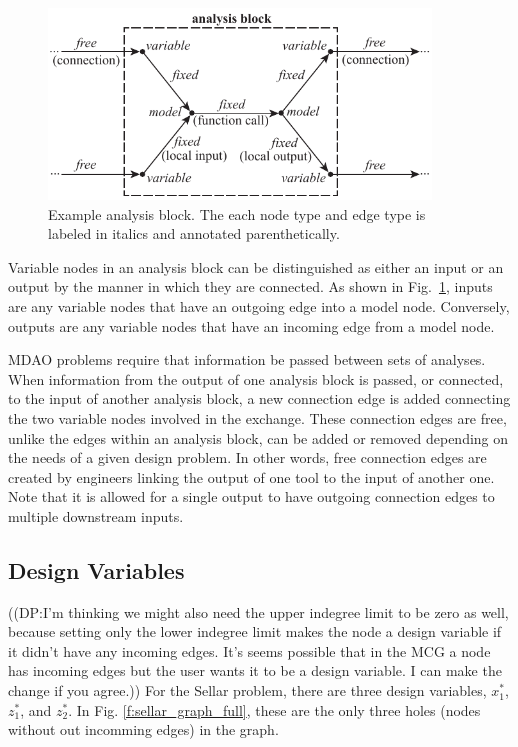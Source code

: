 \begin{figure}[htb!]
    \begin{center}
    \includegraphics[width=4in]{images/analysis_block}
    \end{center}
    \vspace{-10pt}
\caption{Example analysis block. The each node type and edge type is labeled in italics and annotated parenthetically.}
\label{f:analysis block}
\end{figure}

Variable nodes in an analysis block can be distinguished as either an input or 
an output by the manner in which they are connected. As shown in Fig.~\ref{f:analysis block}, 
inputs are any variable nodes that have an outgoing edge into a model 
node. Conversely, outputs are any variable nodes that have an incoming edge from a model node. 

MDAO problems require that information be passed between sets of analyses. When 
information from the output of one analysis block is passed, or connected, to the 
input of another analysis block, a new connection edge is added connecting the two 
variable nodes involved in the exchange. These connection edges are free, unlike the edges 
within an analysis block, can be added or removed depending on the needs
of a given design problem. In other words, free connection edges are created by 
engineers linking the output of one tool to the input of another one. Note that 
it is allowed for a single output to have outgoing connection edges to multiple 
downstream inputs. 

\subsection{Design Variables}
((DP:I'm thinking we might also need the upper indegree limit to be zero as well, because setting only the lower indegree limit makes the node a design variable if it didn't have any incoming edges. It's seems possible that in the MCG a node has incoming edges but the user wants it to be a design variable. I can make the change if you agree.))
For the Sellar problem, there are three design variables, $x_1^*$, $z_1^*$, and $z_2^*$. In Fig. 
\ref{f:sellar_graph_full}, these are the only three holes (nodes without out 
incomming edges) in the graph. 

